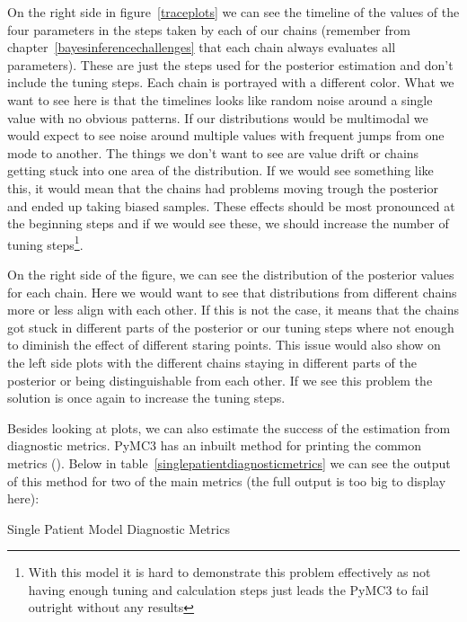 \documentclass[12pt,a4paper,leqno]{report}
\theoremstyle{plain}
\theoremstyle{definition}
\theoremstyle{remark}
\begin{document}
On the right side in figure\ \ref{traceplots} we can see the timeline of the values of the
four parameters in the steps taken by each of our
chains (remember from chapter\ \ref{bayesinferencechallenges} that
each chain always evaluates all parameters). These are just the steps used for the
posterior estimation and don't include the
tuning steps. Each chain is portrayed with a different color. What we want to see
here is that the timelines looks like random noise around a single value with no obvious
patterns. If our distributions would be multimodal we would expect to see noise around
multiple values with frequent jumps from one mode to another. The things
we don't want to see are value drift or chains getting stuck into one area of the
distribution. If we would see something like this,
it would mean that the chains had problems moving trough the posterior and ended up
taking biased samples. These effects should be most pronounced at the beginning
steps and if we would see these, we should increase the number of tuning
steps\footnote{With this model it is hard to
demonstrate this problem effectively as not having enough tuning and
calculation steps just leads the PyMC3 to fail outright without any results}.

On the right side of the figure, we can see the distribution of the posterior values for
each chain. Here we
would want to see that distributions from different chains more or less align with
each other. If this is not the case, it means that the chains got stuck in different
parts of the posterior or our tuning steps where not enough to diminish the effect of
different staring points. This issue would also show on the left side plots with the different
chains staying in different parts of the posterior or being distinguishable from each
other. If we see this problem the solution is once again to increase the tuning steps.

Besides looking at plots, we can also estimate the success of the estimation from
diagnostic metrics. PyMC3 has an inbuilt method for printing the common metrics
(). Below in table\ \ref{singlepatientdiagnosticmetrics} we can see the output
of this method for two of the main metrics (the full output is too big to display here):

\bigskip
\begin{table}[H]
    \caption{Single Patient Model Diagnostic Metrics}\label{singlepatientdiagnosticmetrics}
    \bigskip
    \centering
    
\end{table}
\smallskip
\end{document}
